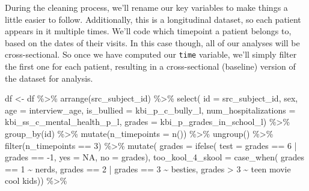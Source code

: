 \documentclass[
]{book}
\newenvironment{Shaded}{\begin{snugshade}}{\end{snugshade}}
\newcommand{\AttributeTok}[1]{\textcolor[rgb]{0.77,0.63,0.00}{#1}}
\newcommand{\ConstantTok}[1]{\textcolor[rgb]{0.00,0.00,0.00}{#1}}
\newcommand{\DecValTok}[1]{\textcolor[rgb]{0.00,0.00,0.81}{#1}}
\newcommand{\FunctionTok}[1]{\textcolor[rgb]{0.00,0.00,0.00}{#1}}
\newcommand{\NormalTok}[1]{#1}
\newcommand{\OtherTok}[1]{\textcolor[rgb]{0.56,0.35,0.01}{#1}}
\newcommand{\SpecialCharTok}[1]{\textcolor[rgb]{0.00,0.00,0.00}{#1}}
\newcommand{\StringTok}[1]{\textcolor[rgb]{0.31,0.60,0.02}{#1}}
\begin{document}
During the cleaning process, we'll rename our key variables to make things a little easier to follow. Additionally, this is a longitudinal dataset, so each patient appears in it multiple times. We'll code which timepoint a patient belongs to, based on the dates of their visits. In this case though, all of our analyses will be cross-sectional. So once we have computed our \texttt{time} variable, we'll simply filter the first one for each patient, resulting in a cross-sectional (baseline) version of the dataset for analysis.

\begin{Shaded}
\begin{Highlighting}[]
\NormalTok{df }\OtherTok{\textless{}{-}}\NormalTok{ df }\SpecialCharTok{\%\textgreater{}\%} 
  \FunctionTok{arrange}\NormalTok{(src\_subject\_id) }\SpecialCharTok{\%\textgreater{}\%} 
  \FunctionTok{select}\NormalTok{(}
    \AttributeTok{id =}\NormalTok{ src\_subject\_id, }
\NormalTok{    sex,}
    \AttributeTok{age =}\NormalTok{ interview\_age, }
    \AttributeTok{is\_bullied =}\NormalTok{ kbi\_p\_c\_bully\_l,}
    \AttributeTok{num\_hospitalizations =}\NormalTok{ kbi\_ss\_c\_mental\_health\_p\_l,}
    \AttributeTok{grades =}\NormalTok{ kbi\_p\_grades\_in\_school\_l) }\SpecialCharTok{\%\textgreater{}\%} 
  \FunctionTok{group\_by}\NormalTok{(id) }\SpecialCharTok{\%\textgreater{}\%} 
  \FunctionTok{mutate}\NormalTok{(}\AttributeTok{n\_timepoints =} \FunctionTok{n}\NormalTok{()) }\SpecialCharTok{\%\textgreater{}\%} 
  \FunctionTok{ungroup}\NormalTok{() }\SpecialCharTok{\%\textgreater{}\%} 
  \FunctionTok{filter}\NormalTok{(n\_timepoints }\SpecialCharTok{==} \DecValTok{3}\NormalTok{) }\SpecialCharTok{\%\textgreater{}\%} 
  \FunctionTok{mutate}\NormalTok{(}
    \AttributeTok{grades =} \FunctionTok{ifelse}\NormalTok{(}
      \AttributeTok{test =}\NormalTok{ grades }\SpecialCharTok{==} \DecValTok{6} \SpecialCharTok{|}\NormalTok{ grades }\SpecialCharTok{==} \SpecialCharTok{{-}}\DecValTok{1}\NormalTok{,}
      \AttributeTok{yes =} \ConstantTok{NA}\NormalTok{,}
      \AttributeTok{no =}\NormalTok{ grades),}
    \AttributeTok{too\_kool\_4\_skool =} \FunctionTok{case\_when}\NormalTok{(}
\NormalTok{      grades }\SpecialCharTok{==} \DecValTok{1} \SpecialCharTok{\textasciitilde{}} \StringTok{\textquotesingle{}nerds\textquotesingle{}}\NormalTok{,}
\NormalTok{      grades }\SpecialCharTok{==} \DecValTok{2} \SpecialCharTok{|}\NormalTok{ grades }\SpecialCharTok{==} \DecValTok{3} \SpecialCharTok{\textasciitilde{}} \StringTok{\textquotesingle{}besties\textquotesingle{}}\NormalTok{,}
\NormalTok{      grades }\SpecialCharTok{\textgreater{}} \DecValTok{3} \SpecialCharTok{\textasciitilde{}} \StringTok{\textquotesingle{}teen movie cool kids\textquotesingle{}}\NormalTok{)) }\SpecialCharTok{\%\textgreater{}\%} 

\end{Highlighting}
\end{Shaded}
\end{document}
